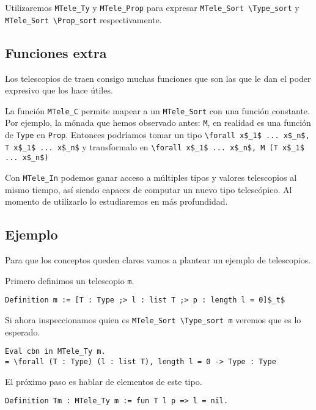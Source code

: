 Utilizaremos \lstinline{MTele_Ty} y \lstinline{MTele_Prop} para expresar \lstinline{MTele_Sort \Type_sort} y \lstinline{MTele_Sort \Prop_sort} respectivamente.

\subsection{Funciones extra}

Los telescopios de \Mtac traen consigo muchas funciones que son las que le dan el poder expresivo que los hace útiles. 

La función \lstinline{MTele_C} permite mapear a un \lstinline{MTele_Sort} con una función constante.
Por ejemplo, la mónada que hemos observado antes: \lstinline{M}, en realidad es una función de \lstinline{Type} en \lstinline{Prop}.
Entonces podríamos tomar un tipo \lstinline{\forall x$_1$ ... x$_n$, T x$_1$ ... x$_n$} y transformalo en \lstinline{\forall x$_1$ ... x$_n$, M (T x$_1$ ... x$_n$)}

Con \lstinline{MTele_In} podemos ganar acceso a múltiples tipos y valores telescopios al mismo tiempo, así siendo capaces de computar un nuevo tipo telescópico.
Al momento de utilizarlo lo estudiaremos en más profundidad.

\subsection{Ejemplo}

Para que los conceptos queden claros vamos a plantear un ejemplo de telescopios.

Primero definimos un telescopio \lstinline{m}.

\begin{lstlisting}
Definition m := [T : Type ;> l : list T ;> p : length l = 0]$_t$
\end{lstlisting}

Si ahora inspeccionamos quien es \lstinline{MTele_Sort \Type_sort m} veremos que es lo esperado.

\begin{lstlisting}
Eval cbn in MTele_Ty m.
= \forall (T : Type) (l : list T), length l = 0 -> Type : Type
\end{lstlisting}

El próximo paso es hablar de elementos de este tipo.

\begin{lstlisting}
Definition Tm : MTele_Ty m := fun T l p => l = nil.
\end{lstlisting}

